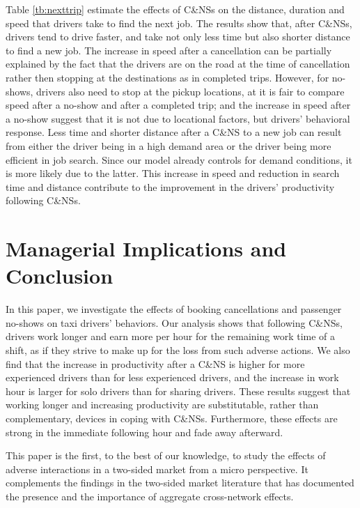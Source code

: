 \documentclass[reviewmode]{AEA}
\begin{document}
Table \ref{tb:nexttrip} estimate the effects of C\&NSs on the distance, duration and speed that drivers take to find the next job. The results show that, after C\&NSs, drivers tend to drive faster, and take not only less time but also shorter distance to find a new job. The increase in speed after a cancellation can be partially explained by the fact that the drivers are on the road at the time of cancellation rather then stopping at the destinations as in completed trips. However, for no-shows, drivers also need to stop at the pickup locations, at it is fair to compare speed after a no-show and after a completed trip; and the increase in speed after a no-show suggest that it is not due to locational factors, but drivers' behavioral response. Less time and shorter distance after a C\&NS to a new job can result from either the driver being in a high demand area or the driver being more efficient in job search. Since our model already controls for demand conditions, it is more likely due to the latter. This increase in speed and reduction in search time and distance contribute to the improvement in the drivers' productivity following C\&NSs.

\section{Managerial Implications and Conclusion}


In this paper, we investigate the effects of booking cancellations and passenger no-shows on taxi drivers' behaviors. Our analysis shows that following C\&NSs, drivers work longer and earn more per hour for the remaining work time of a shift, as if they strive to make up for the loss from such adverse actions. We also find that the increase in productivity after a C\&NS is higher for more experienced drivers than for less experienced drivers, and the increase in work hour is larger for solo drivers than for sharing drivers. These results suggest that working longer and increasing productivity are substitutable, rather than complementary, devices in coping with C\&NSs. Furthermore, these effects are strong in the immediate following hour and fade away afterward.

This paper is the first, to the best of our knowledge, to study the effects of adverse interactions in a two-sided market from a micro perspective. It complements the findings in the two-sided market literature that has documented the presence and the importance of aggregate cross-network effects.
\end{document}
